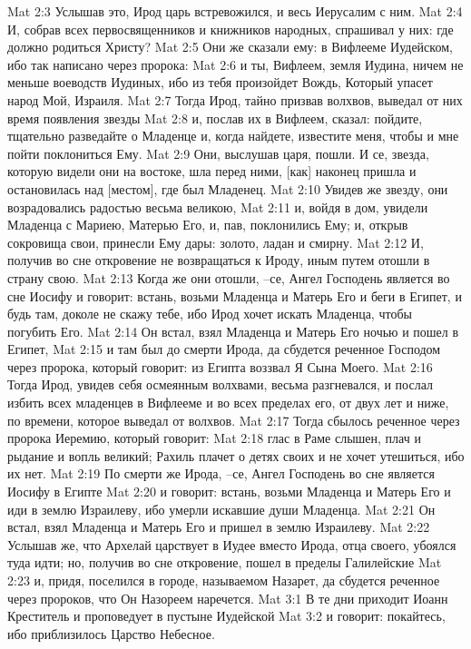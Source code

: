 Mat 2:3  Услышав это, Ирод царь встревожился, и весь Иерусалим с ним.
Mat 2:4  И, собрав всех первосвященников и книжников народных, спрашивал у них: где должно родиться Христу?
Mat 2:5  Они же сказали ему: в Вифлееме Иудейском, ибо так написано через пророка:
Mat 2:6  и ты, Вифлеем, земля Иудина, ничем не меньше воеводств Иудиных, ибо из тебя произойдет Вождь, Который упасет народ Мой, Израиля.
Mat 2:7  Тогда Ирод, тайно призвав волхвов, выведал от них время появления звезды
Mat 2:8  и, послав их в Вифлеем, сказал: пойдите, тщательно разведайте о Младенце и, когда найдете, известите меня, чтобы и мне пойти поклониться Ему.
Mat 2:9  Они, выслушав царя, пошли. И се, звезда, которую видели они на востоке, шла перед ними, [как] наконец пришла и остановилась над [местом], где был Младенец.
Mat 2:10  Увидев же звезду, они возрадовались радостью весьма великою,
Mat 2:11  и, войдя в дом, увидели Младенца с Мариею, Матерью Его, и, пав, поклонились Ему; и, открыв сокровища свои, принесли Ему дары: золото, ладан и смирну.
Mat 2:12  И, получив во сне откровение не возвращаться к Ироду, иным путем отошли в страну свою.
Mat 2:13  Когда же они отошли, --се, Ангел Господень является во сне Иосифу и говорит: встань, возьми Младенца и Матерь Его и беги в Египет, и будь там, доколе не скажу тебе, ибо Ирод хочет искать Младенца, чтобы погубить Его.
Mat 2:14  Он встал, взял Младенца и Матерь Его ночью и пошел в Египет,
Mat 2:15  и там был до смерти Ирода, да сбудется реченное Господом через пророка, который говорит: из Египта воззвал Я Сына Моего.
Mat 2:16  Тогда Ирод, увидев себя осмеянным волхвами, весьма разгневался, и послал избить всех младенцев в Вифлееме и во всех пределах его, от двух лет и ниже, по времени, которое выведал от волхвов.
Mat 2:17  Тогда сбылось реченное через пророка Иеремию, который говорит:
Mat 2:18  глас в Раме слышен, плач и рыдание и вопль великий; Рахиль плачет о детях своих и не хочет утешиться, ибо их нет.
Mat 2:19  По смерти же Ирода, --се, Ангел Господень во сне является Иосифу в Египте
Mat 2:20  и говорит: встань, возьми Младенца и Матерь Его и иди в землю Израилеву, ибо умерли искавшие души Младенца.
Mat 2:21  Он встал, взял Младенца и Матерь Его и пришел в землю Израилеву.
Mat 2:22  Услышав же, что Архелай царствует в Иудее вместо Ирода, отца своего, убоялся туда идти; но, получив во сне откровение, пошел в пределы Галилейские
Mat 2:23  и, придя, поселился в городе, называемом Назарет, да сбудется реченное через пророков, что Он Назореем наречется.
Mat 3:1  В те дни приходит Иоанн Креститель и проповедует в пустыне Иудейской
Mat 3:2  и говорит: покайтесь, ибо приблизилось Царство Небесное.
